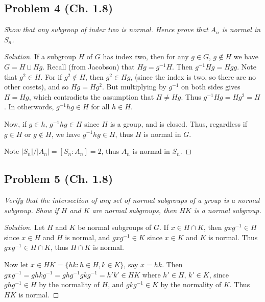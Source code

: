 \documentclass{article}
\begin{document}
\subsection*{Problem 4 (Ch. 1.8)}
{\it Show that any subgroup of index two is normal.
Hence prove that $A_n$ is normal in $S_n$.}
\begin{proof}[Solution]\let\qed\relax
	If a subgroup $H$ of $G$ has index two,
	then for any $g \in G$, $g \not\in H$
	we have $G = H \sqcup Hg$.
	Recall (from Jacobson) that $Hg = g^{-1}H$.
	Then $g^{-1}Hg = Hgg$.
	Note that $g^2 \in H$.
	For if $g^2 \not\in H$, then $g^2 \in Hg$,
	(since the index is two, so there are no other cosets),
	and so $Hg = Hg^2$.
	But multiplying by $g^{-1}$ on both sides gives
	$H = Hg$, which contradicts the assumption that $H \neq Hg$.
	Thus $g^{-1}Hg = Hg^2 = H$.
	In otherwords, $g^{-1}hg \in H$ for all $h \in H$.

	Now, if $g \in h$, $g^{-1}hg \in H$ since $H$ is a group, and is closed.
	Thus, regardless if $g \in H$ or $g \not\in H$, we have $g^{-1}hg \in H$,
	thus $H$ is normal in $G$.

	Note $|S_n|/|A_n| = [S_n : A_n] = 2$,
	thus $A_n$ is normal in $S_n$.
\end{proof}

\subsection*{Problem 5 (Ch. 1.8)}
{\it Verify that the intersection of any set of normal subgroups
of a group is a normal subgroup.
Show if $H$ and $K$ are normal subgroups,
then $HK$ is a normal subgroup.}
\begin{proof}[Solution]\let\qed\relax
	Let $H$ and $K$ be normal subgroups of $G$.
	If $x \in H \cap K$,
	then $gxg^{-1} \in H$ since $x \in H$ and $H$ is normal,
	and $gxg^{-1} \in K$ since $x \in K$ and $K$ is normal.
	Thus $gxg^{-1} \in H \cap K$, thus $H \cap K$ is normal.

	Now let $x \in HK = \{hk \colon h \in H, k \in K\}$,
	say $x = hk$.
	Then $gxg^{-1} = ghkg^{-1} = ghg^{-1}gkg^{-1} = h'k' \in HK$
	where $h' \in H$, $k' \in K$, since $ghg^{-1} \in H$ by the normality of $H$,
	and $gkg^{-1} \in K$ by the normality of $K$.
	Thus $HK$ is normal.
\end{proof}
\end{document}

